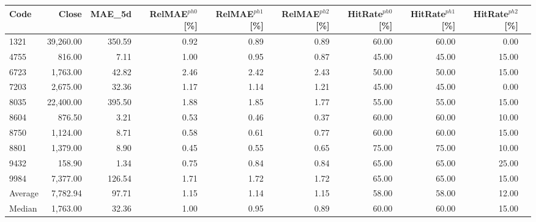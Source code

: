 \begingroup
\footnotesize
\begin{tabular}{lrrrrrrrrr}
\hline
Code & Close & MAE\_5d & RelMAE$^{ph0}$[\%] & RelMAE$^{ph1}$[\%] & RelMAE$^{ph2}$[\%] & HitRate$^{ph0}$[\%] & HitRate$^{ph1}$[\%] & HitRate$^{ph2}$[\%] \\
\hline
1321 & 39,260.00 & 350.59 & 0.92 & 0.89 & 0.89 & 60.00 & 60.00 & 0.00 \\
4755 & 816.00 & 7.11 & 1.00 & 0.95 & 0.87 & 45.00 & 45.00 & 15.00 \\
6723 & 1,763.00 & 42.82 & 2.46 & 2.42 & 2.43 & 50.00 & 50.00 & 15.00 \\
7203 & 2,675.00 & 32.36 & 1.17 & 1.14 & 1.21 & 45.00 & 45.00 & 0.00 \\
8035 & 22,400.00 & 395.50 & 1.88 & 1.85 & 1.77 & 55.00 & 55.00 & 15.00 \\
8604 & 876.50 & 3.21 & 0.53 & 0.46 & 0.37 & 60.00 & 60.00 & 10.00 \\
8750 & 1,124.00 & 8.71 & 0.58 & 0.61 & 0.77 & 60.00 & 60.00 & 15.00 \\
8801 & 1,379.00 & 8.90 & 0.45 & 0.55 & 0.65 & 75.00 & 75.00 & 10.00 \\
9432 & 158.90 & 1.34 & 0.75 & 0.84 & 0.84 & 65.00 & 65.00 & 25.00 \\
9984 & 7,377.00 & 126.54 & 1.71 & 1.72 & 1.72 & 65.00 & 65.00 & 15.00 \\
Average & 7,782.94 & 97.71 & 1.15 & 1.14 & 1.15 & 58.00 & 58.00 & 12.00 \\
Median & 1,763.00 & 32.36 & 1.00 & 0.95 & 0.89 & 60.00 & 60.00 & 15.00 \\
\hline
\end{tabular}
\endgroup